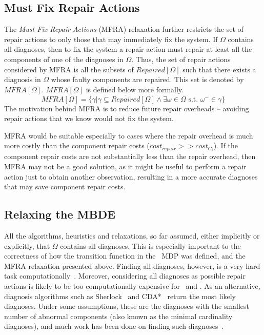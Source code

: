 \subsection{Must Fix Repair Actions}
The {\em Must Fix Repair Actions} (MFRA) relaxation further restricts the set of repair actions to only those that may immediately fix the system. If $\Omega$ contains all diagnoses, then to fix the system a repair action must repair at least all the components of one of the diagnoses in $\Omega$. Thus, the set of repair actions considered by MFRA is all the subsets of $\overline{Repaired}[\Omega]$ such that there exists a diagnosis in $\Omega$ whose faulty components are repaired. This set is denoted by $MFRA[\Omega]$. $MFRA[\Omega]$ is defined below more formally.
\[ MFRA[\Omega]=\{ \gamma | \gamma\subseteq \overline{Repaired}[\Omega] \wedge \exists \omega\in\Omega \text{ s.t. } \omega^{-}\in\gamma\}\]
The motivation behind MFRA is to reduce future repair overheads -- avoiding repair actions that we know would not fix the system.

MFRA would be suitable especially to cases where the repair overhead is much more costly than the component repair costs ($cost_{repair}>>cost_{C_i}$).
If the component repair costs are not substantially less than the repair overhead, then MFRA may not be a good solution, as it might be useful to perform a repair action just to obtain another observation, resulting in a more accurate diagnoses that may save component repair costs.



\subsection{Relaxing the MBDE}
All the algorithms, heuristics and relaxations, so far assumed, either implicitly or explicitly, that $\Omega$ contains all diagnoses. This is especially important to the correctness of how the transition function in the \planbased\ MDP was defined, and the MFRA relaxation presented above. Finding all diagnoses, however, is a very hard task computationally~\cite{Selman90}. Moreover, considering all diagnoses as possible repair actions is likely to be too computationally expensive for \myopic\ and \planbased . As an alternative, diagnosis algorithms such as Sherlock~\cite{deKleer1989diagnosis} and CDA*~\cite{williams2007conflict} return the most likely diagnoses. Under some assumptions, these are the diagnoses with the smallest number of abnormal components (also known as the minimal cardinality diagnoses), and much work has been done on finding such diagnoses~\cite{metodi2012compiling,stern2012exploring,de2011hitting,de1987diagnosing}.


